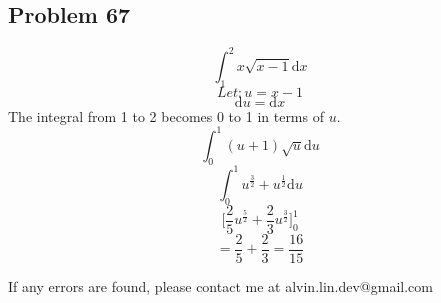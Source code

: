 \documentclass[letterpaper, 12pt]{article}
\newcommand*{\diff}{\mathrm{d}}
\begin{document}
\subsection*{Problem 67}
\[ \int_{1}^{2} x \sqrt{x - 1} \diff{x} \]
\[ Let: u = x - 1 \]
\[ \diff{u} = \diff{x} \]
The integral from 1 to 2 becomes 0 to 1 in terms of \( u \).
\[ \int_{0}^{1} (u + 1)\sqrt{u} \diff{u} \]
\[ \int_{0}^{1} u^\frac{3}{2} + u^\frac{1}{2} \diff{u} \]
\[ \bigg[ \frac{2}{5}u^{\frac{5}{2}} + \frac{2}{3}u^{\frac{3}{2}} \bigg]_0^1 \]
\[ = \frac{2}{5} + \frac{2}{3} = \frac{16}{15} \]

\begin{center}
  If any errors are found, please contact me at alvin.lin.dev@gmail.com
\end{center}
\end{document}
